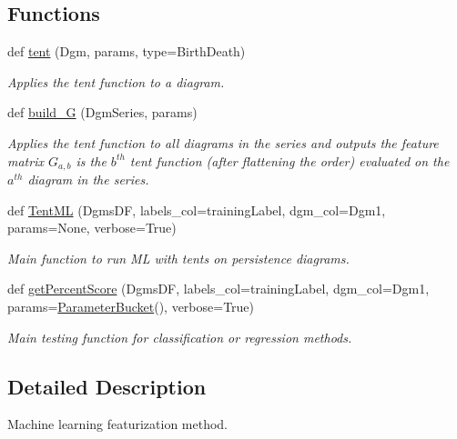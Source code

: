 \subsection*{Functions}
\begin{DoxyCompactItemize}
\item 
def \hyperlink{namespaceteaspoon_1_1_m_l_1_1tents_a6a7e3aad0e7229895aa9f204df7e6304}{tent} (Dgm, params, type=\textquotesingle{}Birth\+Death\textquotesingle{})
\begin{DoxyCompactList}\small\item\em Applies the tent function to a diagram. \end{DoxyCompactList}\item 
def \hyperlink{namespaceteaspoon_1_1_m_l_1_1tents_a2a752f63d55c359140dc7dbbf8fc9b45}{build\+\_\+G} (Dgm\+Series, params)
\begin{DoxyCompactList}\small\item\em Applies the tent function to all diagrams in the series and outputs the feature matrix $G_{a,b}$ is the $b^{th}$ tent function (after flattening the order) evaluated on the $a^{th}$ diagram in the series. \end{DoxyCompactList}\item 
def \hyperlink{namespaceteaspoon_1_1_m_l_1_1tents_aaa857d30483517bcf50adde0116e0995}{Tent\+ML} (Dgms\+DF, labels\+\_\+col=\textquotesingle{}training\+Label\textquotesingle{}, dgm\+\_\+col=\textquotesingle{}Dgm1\textquotesingle{}, params=None, verbose=True)
\begin{DoxyCompactList}\small\item\em Main function to run ML with tents on persistence diagrams. \end{DoxyCompactList}\item 
def \hyperlink{namespaceteaspoon_1_1_m_l_1_1tents_a29e1cc2063fa47537bdbf4373fe6cb7e}{get\+Percent\+Score} (Dgms\+DF, labels\+\_\+col=\textquotesingle{}training\+Label\textquotesingle{}, dgm\+\_\+col=\textquotesingle{}Dgm1\textquotesingle{}, params=\hyperlink{classteaspoon_1_1_m_l_1_1tents_1_1_parameter_bucket}{Parameter\+Bucket}(), verbose=True)
\begin{DoxyCompactList}\small\item\em Main testing function for classification or regression methods. \end{DoxyCompactList}\end{DoxyCompactItemize}


\subsection{Detailed Description}
Machine learning featurization method. 

